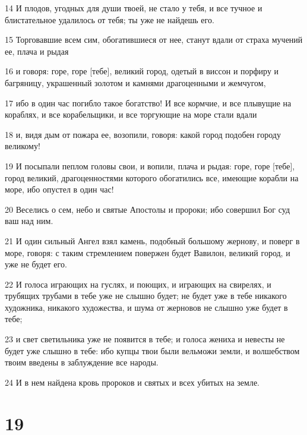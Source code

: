 \par 14 И плодов, угодных для души твоей, не стало у тебя, и все тучное и блистательное удалилось от тебя; ты уже не найдешь его.
\par 15 Торговавшие всем сим, обогатившиеся от нее, станут вдали от страха мучений ее, плача и рыдая
\par 16 и говоря: горе, горе [тебе], великий город, одетый в виссон и порфиру и багряницу, украшенный золотом и камнями драгоценными и жемчугом,
\par 17 ибо в один час погибло такое богатство! И все кормчие, и все плывущие на кораблях, и все корабельщики, и все торгующие на море стали вдали
\par 18 и, видя дым от пожара ее, возопили, говоря: какой город подобен городу великому!
\par 19 И посыпали пеплом головы свои, и вопили, плача и рыдая: горе, горе [тебе], город великий, драгоценностями которого обогатились все, имеющие корабли на море, ибо опустел в один час!
\par 20 Веселись о сем, небо и святые Апостолы и пророки; ибо совершил Бог суд ваш над ним.
\par 21 И один сильный Ангел взял камень, подобный большому жернову, и поверг в море, говоря: с таким стремлением повержен будет Вавилон, великий город, и уже не будет его.
\par 22 И голоса играющих на гуслях, и поющих, и играющих на свирелях, и трубящих трубами в тебе уже не слышно будет; не будет уже в тебе никакого художника, никакого художества, и шума от жерновов не слышно уже будет в тебе;
\par 23 и свет светильника уже не появится в тебе; и голоса жениха и невесты не будет уже слышно в тебе: ибо купцы твои были вельможи земли, и волшебством твоим введены в заблуждение все народы.
\par 24 И в нем найдена кровь пророков и святых и всех убитых на земле.

\chapter{19}

